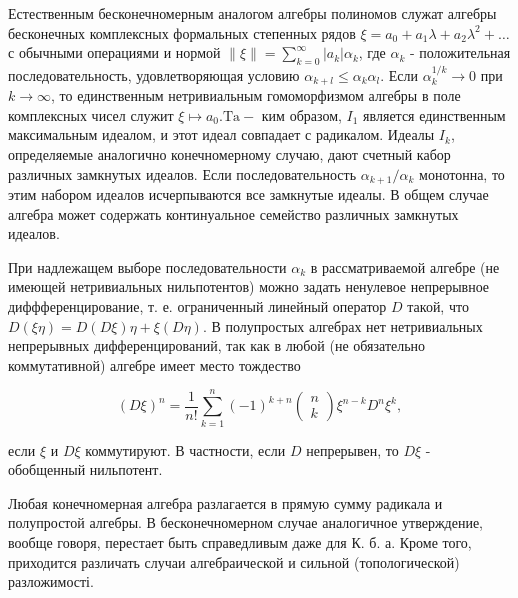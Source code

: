 \documentclass[10pt]{article}
\begin{document}
Естественным бесконечномерным аналогом алгебры полиномов служат алгебры бесконечных комплексных формальных степенных рядов $\xi=a_{0}+a_{1} \lambda+a_{2} \lambda^{2}+\ldots$ с обычными операциями и нормой $\|\xi\|=\sum_{k=0}^{\infty}\left|a_{k}\right| \alpha_{k}$, где $\alpha_{k}$ - положительная последовательность, удовлетворяющая условию $\alpha_{k+l} \leqslant \alpha_{k} \alpha_{l}$. Если $\alpha_{k}^{1 / k} \rightarrow 0$ при $k \rightarrow \infty$, то единственным нетривиальным гомоморфизмом алгебры в поле комплексных чисел служит $\xi \mapsto a_{0} . \mathrm{Ta}-$ ким образом, $I_{1}$ является единственным максимальным идеалом, и этот идеал совпадает с радикалом. Идеалы $I_{k}$, определяемые аналогично конечномерному случаю, дают счетный кабор различных замкнутых идеалов. Если последовательность $\alpha_{k+1} / \alpha_{k}$ монотонна, то этим набором идеалов исчерпываются все замкнутые идеалы. В общем случае алгебра может содержать континуальное семейство различных замкнутых идеалов.



При надлежащем выборе последовательности $\alpha_{k}$ в рассматриваемой алгебре (не имеющей нетривиальных нильпотентов) можно задать ненулевое непрерывное диффференцирование, т. е. ограниченный линейный оператор $D$ такой, что $D(\xi \eta)=D(D \xi) \eta+\xi(D \eta)$. В полупростых алгебрах нет нетривиальных непрерывных дифференцирований, так как в любой (не обязательно коммутативной) алгебре имеет место тождество



\[

(D \xi)^{n}=\frac{1}{n !} \sum_{k=1}^{n}(-1)^{k+n}\left(\begin{array}{l}

n \\

k

\end{array}\right) \xi^{n-k} D^{n} \xi^{k},

\]



если $\xi$ и $D \xi$ коммутируют. В частности, если $D$ непрерывен, то $D \xi$ - обобщенный нильпотент.



Любая конечномерная алгебра разлагается в прямую сумму радикала и полупростой алгебры. В бесконечномерном случае аналогичное утверждение, вообще говоря, перестает быть справедливым даже для К. б. а. Кроме того, приходится различать случаи алгебраической и сильной (топологической) разложимості.
\end{document}
